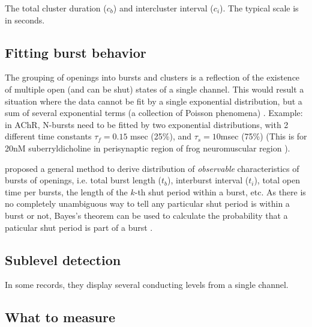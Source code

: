The total cluster duration ($c_b$) and intercluster interval ($c_i$). The
typical scale is in seconds.

\subsection{Fitting burst behavior}

The grouping of openings into bursts and clusters is a reflection of the
existence of multiple open (and can be shut) states of a single channel. This
would result a situation where the data cannot be fit by a single exponential
distribution, but a sum of several exponential terms (a collection of Poisson
phenomena) \citep{colquhoun1977rfm}. Example: in AChR, N-bursts need to be
fitted by two exponential distributions, with 2 different time constants
$\tau_f=0.15$ msec (25\%), and $\tau_s=10$msec (75\%) (This is for 20nM
suberryldicholine in perisynaptic region of frog neuromuscular region
\citep{colquhoun1981fmt}).

\citep{colquhoun1982osp} proposed a general method to derive distribution of
{\it observable} characteristics of bursts of openings, i.e. total burst length
($t_b$), interburst interval ($t_i$), total open time per bursts, the length
of the $k$-th shut period within a burst, etc. As there is no completely
unambiguous way to tell any particular shut period is within a burst or not,
Bayes's theorem can be used to calculate the probability that a paticular shut
period is part of a burst \citep{colquhoun1981sps}.



\subsection{Sublevel detection}
\label{sec:sublevel-detection}

In some records, they display several conducting levels from a single
channel.

\subsection{What to measure}
\label{sec:what2measure}

